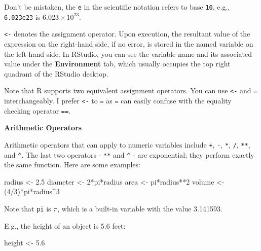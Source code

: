 \documentclass[
  letterpaper,
]{book}
\newenvironment{Shaded}{\begin{snugshade}}{\end{snugshade}}
\newcommand{\DecValTok}[1]{\textcolor[rgb]{0.68,0.00,0.00}{#1}}
\newcommand{\FloatTok}[1]{\textcolor[rgb]{0.68,0.00,0.00}{#1}}
\newcommand{\NormalTok}[1]{\textcolor[rgb]{0.00,0.23,0.31}{#1}}
\newcommand{\OtherTok}[1]{\textcolor[rgb]{0.00,0.23,0.31}{#1}}
\newcommand{\SpecialCharTok}[1]{\textcolor[rgb]{0.37,0.37,0.37}{#1}}
\begin{document}
Don't be mistaken, the \texttt{e} in the scientific notation refers to
base \texttt{10}, e.g., \texttt{6.023e23} is \(6.023\times10^{23}\).

\texttt{\textless{}-} denotes the assignment operator. Upon execution,
the resultant value of the expression on the right-hand side, if no
error, is stored in the named variable on the left-hand side. In
RStudio, you can see the variable name and its associated value under
the \textbf{Environment} tab, which usually occupies the top right
quadrant of the RStudio desktop.

Note that R supports two equivalent assignment operators. You can use
\texttt{\textless{}-} and \texttt{=} interchangeably. I prefer
\texttt{\textless{}-} to \texttt{=} as \texttt{=} can easily confuse
with the equality checking operator \texttt{==}.

\textbf{Arithmetic Operators}

Arithmetic operators that can apply to numeric variables include
\texttt{+}, \texttt{-}, \texttt{*}, \texttt{/}, \texttt{**}, and
\texttt{\^{}}. The last two operators - \texttt{**} and \texttt{\^{}} -
are exponential; they perform exactly the same function. Here are some
examples:

\begin{Shaded}
\begin{Highlighting}[]
\NormalTok{radius }\OtherTok{\textless{}{-}} \FloatTok{2.5}
\NormalTok{diameter }\OtherTok{\textless{}{-}} \DecValTok{2}\SpecialCharTok{*}\NormalTok{pi}\SpecialCharTok{*}\NormalTok{radius}
\NormalTok{area }\OtherTok{\textless{}{-}}\NormalTok{ pi}\SpecialCharTok{*}\NormalTok{radius}\SpecialCharTok{**}\DecValTok{2}
\NormalTok{volume }\OtherTok{\textless{}{-}}\NormalTok{ (}\DecValTok{4}\SpecialCharTok{/}\DecValTok{3}\NormalTok{)}\SpecialCharTok{*}\NormalTok{pi}\SpecialCharTok{*}\NormalTok{radius}\SpecialCharTok{\^{}}\DecValTok{3}
\end{Highlighting}
\end{Shaded}

Note that \texttt{pi} is \(\pi\), which is a built-in variable with the
value 3.141593.

E.g., the height of an object is 5.6 feet:

\begin{Shaded}
\begin{Highlighting}[]
\NormalTok{height }\OtherTok{\textless{}{-}} \FloatTok{5.6}
\end{Highlighting}
\end{Shaded}
\end{document}
